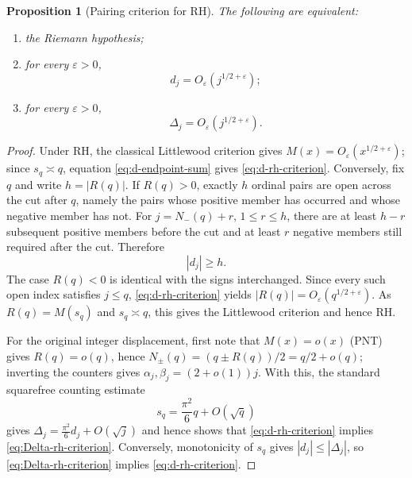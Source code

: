 \documentclass[11pt]{amsart}
\numberwithin{equation}{section}
\theoremstyle{plain}
\newtheorem{proposition}[theorem]{Proposition}
\theoremstyle{definition}
\theoremstyle{remark}
\newcommand{\Mert}{M}
\begin{document}
\begin{proposition}[Pairing criterion for RH]
\label{prop:pairing-rh}
The following are equivalent:
\begin{enumerate}[label=(\alph*)]
\item the Riemann hypothesis;
\item for every $\varepsilon>0$,
\begin{equation}
\label{eq:d-rh-criterion}
d_j=O_\varepsilon\!\left(j^{1/2+\varepsilon}\right);
\end{equation}
\item for every $\varepsilon>0$,
\begin{equation}
\label{eq:Delta-rh-criterion}
\Delta_j=O_\varepsilon\!\left(j^{1/2+\varepsilon}\right).
\end{equation}
\end{enumerate}
\end{proposition}

\begin{proof}
Under RH, the classical Littlewood criterion gives
$M(x)=O_\varepsilon(x^{1/2+\varepsilon})$; since $s_q\asymp q$, equation
\eqref{eq:d-endpoint-sum} gives \eqref{eq:d-rh-criterion}.
Conversely, fix $q$ and write $h=|R(q)|$.  If $R(q)>0$, exactly $h$ ordinal
pairs are open across the cut after $q$, namely the pairs whose positive member
has occurred and whose negative member has not.  For
$j=N_-(q)+r$, $1\le r\le h$, there are at least $h-r$ subsequent positive
members before the cut and at least $r$ negative members still required after
the cut.  Therefore
\begin{equation}
\label{eq:open-pair-lower-bound}
|d_j|\ge h.
\end{equation}
The case $R(q)<0$ is identical with the signs interchanged.  Since every such
open index satisfies $j\le q$, \eqref{eq:d-rh-criterion} yields
$|R(q)|=O_\varepsilon(q^{1/2+\varepsilon})$.  As $R(q)=M(s_q)$ and $s_q\asymp q$,
this gives the Littlewood criterion and hence RH.

For the original integer displacement, first note that $\Mert(x)=o(x)$ (PNT)
gives $R(q)=o(q)$, hence $N_\pm(q)=(q\pm R(q))/2=q/2+o(q)$; inverting the
counters gives $\alpha_j,\beta_j=(2+o(1))j$.  With this, the standard squarefree
counting estimate \cite{Apostol1976}
\begin{equation}
\label{eq:squarefree-inverse}
s_q=\frac{\pi^2}{6}q+O(\sqrt q)
\end{equation}
gives $\Delta_j=\tfrac{\pi^2}{6}d_j+O(\sqrt j)$ and hence shows that
\eqref{eq:d-rh-criterion} implies \eqref{eq:Delta-rh-criterion}.  Conversely, monotonicity of $s_q$ gives
$|d_j|\le|\Delta_j|$, so \eqref{eq:Delta-rh-criterion} implies
\eqref{eq:d-rh-criterion}.
\end{proof}
\end{document}
